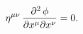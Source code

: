 \begin{equation}
\eta^{\mu \nu}\, {\partial^2 \, \phi \over \partial 
x^{\mu} \partial x^{\nu}}=0. \label{scal}
\end{equation}

